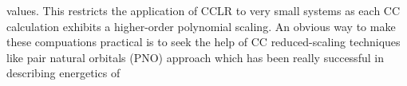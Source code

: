 values. This restricts the application of CCLR to very small systems as each CC calculation exhibits
a higher-order polynomial scaling.
%
%
%
An obvious way to make these compuations practical is to seek the help of CC reduced-scaling 
techniques like pair natural orbitals (PNO) approach\cite{Neese09,NeeseCCSD09} which has been really successful in describing energetics of 
